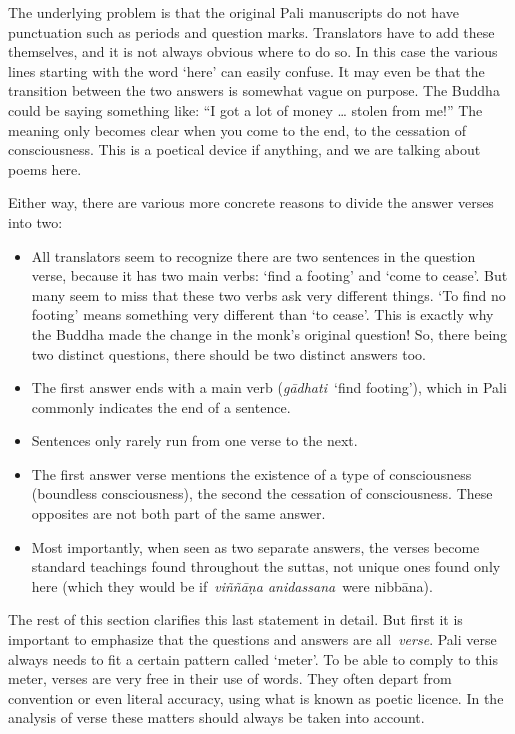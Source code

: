 \documentclass[10pt, openany]{book}
\begin{document}
The underlying problem is that the original Pali manuscripts do not have punctuation such as periods and question marks. Translators have to add these themselves, and it is not always obvious where to do so. In this case the various lines starting with the word ‘here’ can easily confuse. It may even be that the transition between the two answers is somewhat vague on purpose. The Buddha could be saying something like: “I got a lot of money … stolen from me!” The meaning only becomes clear when you come to the end, to the cessation of consciousness. This is a poetical device if anything, and we are talking about poems here.


Either way, there are various more concrete reasons to divide the answer verses into two:


\begin{itemize}

\itemsep5pt\parskip0pt


\item
All translators seem to recognize there are two sentences in the question verse, because it has two main verbs: ‘find a footing’ and ‘come to cease’. But many seem to miss that these two verbs ask very different things. ‘To find no footing’ means something very different than ‘to cease’. This is exactly why the Buddha made the change in the monk’s original question! So, there being two distinct questions, there should be two distinct answers too.



\item
The first answer ends with a main verb (\textit{gādhati} ‘find footing’), which in Pali commonly indicates the end of a sentence.



\item
Sentences only rarely run from one verse to the next.



\item
The first answer verse mentions the existence of a type of consciousness (boundless consciousness), the second the cessation of consciousness. These opposites are not both part of the same answer.



\item
Most importantly, when seen as two separate answers, the verses become standard teachings found throughout the suttas, not unique ones found only here (which they would be if \textit{viññāṇa anidassana} were nibbāna).





\end{itemize}
The rest of this section clarifies this last statement in detail. But first it is important to emphasize that the questions and answers are all \textit{verse}. Pali verse always needs to fit a certain pattern called ‘meter’. To be able to comply to this meter, verses are very free in their use of words. They often depart from convention or even literal accuracy, using what is known as poetic licence. In the analysis of verse these matters should always be taken into account.
\end{document}
